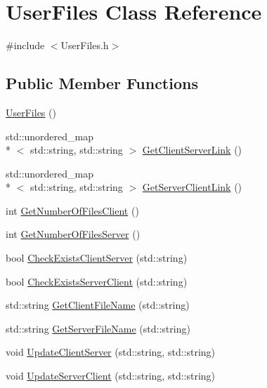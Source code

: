 \hypertarget{classUserFiles}{\section{User\-Files Class Reference}
\label{classUserFiles}
}


{\ttfamily \#include $<$User\-Files.\-h$>$}

\subsection*{Public Member Functions}
\begin{DoxyCompactItemize}
\item 
\hyperlink{classUserFiles_ad82a0fa947a4b0bee7702bc6727e1207}{User\-Files} ()
\item 
std\-::unordered\-\_\-map\\*
$<$ std\-::string, std\-::string $>$ \hyperlink{classUserFiles_a77cb377fac850fb8851c963bde25e6be}{Get\-Client\-Server\-Link} ()
\item 
std\-::unordered\-\_\-map\\*
$<$ std\-::string, std\-::string $>$ \hyperlink{classUserFiles_af97c9641506db0ddfe4fa2a82be31dc1}{Get\-Server\-Client\-Link} ()
\item 
int \hyperlink{classUserFiles_a2c37eb599ee9af55f90b4bb37ea9fb98}{Get\-Number\-Of\-Files\-Client} ()
\item 
int \hyperlink{classUserFiles_a9427ffb62a6d1920ba7dbf01a5d1b616}{Get\-Number\-Of\-Files\-Server} ()
\item 
bool \hyperlink{classUserFiles_a6bdad918863c5b82e79d22fa18c1b73c}{Check\-Exists\-Client\-Server} (std\-::string)
\item 
bool \hyperlink{classUserFiles_a6c3a786978eb48b4b61e2a93955d74eb}{Check\-Exists\-Server\-Client} (std\-::string)
\item 
std\-::string \hyperlink{classUserFiles_a6f3250b177e40b43d90695a567953fac}{Get\-Client\-File\-Name} (std\-::string)
\item 
std\-::string \hyperlink{classUserFiles_af6bca002a1c3b7639644f2ebc94b1fe7}{Get\-Server\-File\-Name} (std\-::string)
\item 
void \hyperlink{classUserFiles_a15b98cd1b88efc25a76edfa2588d550c}{Update\-Client\-Server} (std\-::string, std\-::string)
\item 
void \hyperlink{classUserFiles_a0f30a588c21458b530527661c59bca9a}{Update\-Server\-Client} (std\-::string, std\-::string)
\item 

\end{DoxyCompactItemize}
